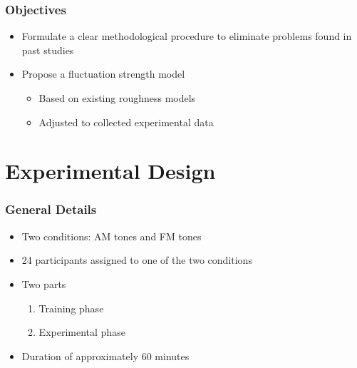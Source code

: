 \documentclass{beamer}
\begin{document}
\begin{frame}
  \frametitle{Objectives}
  \begin{itemize}
    \item Formulate a clear methodological procedure to eliminate problems
      found in past studies
    \item Propose a fluctuation strength model
    \begin{itemize}
      \item Based on existing roughness models
      \item Adjusted to collected experimental data
    \end{itemize}
  \end{itemize}
\end{frame}

\section{Experimental Design}

\begin{frame}
  \frametitle{General Details}
  \begin{itemize}
    \item Two conditions: AM tones and FM tones
    \item 24 participants assigned to one of the two conditions
    \item Two parts
      \begin{enumerate}
        \item Training phase
        \item Experimental phase
      \end{enumerate}
    \item Duration of approximately 60 minutes
  \end{itemize}
\end{frame}
\end{document}

